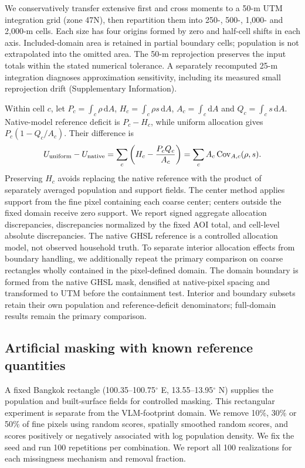 \documentclass[pdflatex,sn-nature]{sn-jnl}
\begin{document}
We conservatively transfer extensive first and cross moments to a 50-m UTM integration grid (zone 47N), then repartition them into 250-, 500-, 1,000- and 2,000-m cells. Each size has four origins formed by zero and half-cell shifts in each axis. Included-domain area is retained in partial boundary cells; population is not extrapolated into the omitted area. The 50-m reprojection preserves the input totals within the stated numerical tolerance. A separately recomputed 25-m integration diagnoses approximation sensitivity, including its measured small reprojection drift (Supplementary Information).

Within cell $c$, let $P_c=\int_c\rho\,\mathrm{d}A$, $H_c=\int_c\rho s\,\mathrm{d}A$, $A_c=\int_c\mathrm{d}A$ and $Q_c=\int_c s\,\mathrm{d}A$. Native-model reference deficit is $P_c-H_c$, while uniform allocation gives $P_c(1-Q_c/A_c)$. Their difference is
\begin{equation}
U_{\rm uniform}-U_{\rm native}
=\sum_c\left(H_c-\frac{P_c Q_c}{A_c}\right)
=\sum_c A_c\operatorname{Cov}_{A,c}(\rho,s).
\label{eq:covariance}
\end{equation}
Preserving $H_c$ avoids replacing the native reference with the product of separately averaged population and support fields. The center method applies support from the fine pixel containing each coarse center; centers outside the fixed domain receive zero support. We report signed aggregate allocation discrepancies, discrepancies normalized by the fixed AOI total, and cell-level absolute discrepancies. The native GHSL reference is a controlled allocation model, not observed household truth. To separate interior allocation effects from boundary handling, we additionally repeat the primary comparison on coarse rectangles wholly contained in the pixel-defined domain. The domain boundary is formed from the native GHSL mask, densified at native-pixel spacing and transformed to UTM before the containment test. Interior and boundary subsets retain their own population and reference-deficit denominators; full-domain results remain the primary comparison.

\subsection{Artificial masking with known reference quantities}
A fixed Bangkok rectangle (100.35--100.75$^\circ$ E, 13.55--13.95$^\circ$ N) supplies the population and built-surface fields for controlled masking. This rectangular experiment is separate from the VLM-footprint domain. We remove 10\%, 30\% or 50\% of fine pixels using random scores, spatially smoothed random scores, and scores positively or negatively associated with log population density. We fix the seed and run 100 repetitions per combination. We report all 100 realizations for each missingness mechanism and removal fraction.
\end{document}
